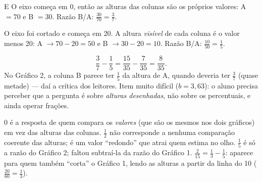 \begin{resolucao}{E}
 O eixo começa em 0, então as alturas das colunas
são os próprios valores: A $= 70$ e B $= 30$. Razão B/A:
$\frac{30}{70} = \frac{3}{7}$.

 O eixo foi cortado e começa em 20. A altura
\emph{visível} de cada coluna é o valor menos 20: A $\to 70 - 20 = 50$ e
B $\to 30 - 20 = 10$. Razão B/A: $\frac{10}{50} = \frac{1}{5}$.

\[
\frac{3}{7} - \frac{1}{5} = \frac{15}{35} - \frac{7}{35} = \frac{8}{35}.
\]
No Gráfico 2, a coluna B parece ter $\frac{1}{5}$ da altura de A, quando deveria ter
$\frac{3}{7}$ (quase metade) — daí a crítica dos leitores. Item muito difícil
($b = 3{,}63$): o aluno precisa perceber que a pergunta é sobre \emph{alturas
desenhadas}, não sobre os percentuais, e ainda operar frações.
\begin{distratores}
 0 é a resposta de quem compara os \emph{valores} (que são os mesmos nos dois
gráficos) em vez das alturas das colunas.
 $\frac{1}{2}$ não corresponde a nenhuma comparação coerente das alturas; é um
valor ``redondo'' que atrai quem estima no olho.
 $\frac{1}{5}$ é só a razão do Gráfico 2; faltou subtraí-la da razão do Gráfico 1.
 $\frac{2}{15} = \frac{1}{3} - \frac{1}{5}$: aparece para quem também ``corta'' o
Gráfico 1, lendo as alturas a partir da linha do 10 ($\frac{20}{60} = \frac{1}{3}$).
\end{distratores}
\end{resolucao}

\secaoineditas


